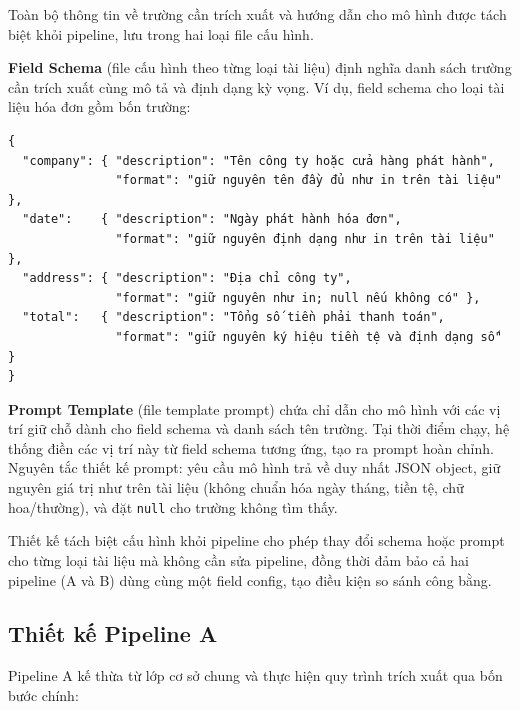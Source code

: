 ﻿\documentclass[12pt]{report}
\begin{document}
Toàn bộ thông tin về trường cần trích xuất và hướng dẫn cho mô hình được tách biệt khỏi pipeline, lưu trong hai loại file cấu hình.

\textbf{Field Schema} (file cấu hình theo từng loại tài liệu) định nghĩa danh sách trường cần trích xuất cùng mô tả và định dạng kỳ vọng. Ví dụ, field schema cho loại tài liệu hóa đơn gồm bốn trường:

\begin{verbatim}
{
  "company": { "description": "Tên công ty hoặc cửa hàng phát hành",
               "format": "giữ nguyên tên đầy đủ như in trên tài liệu" },
  "date":    { "description": "Ngày phát hành hóa đơn",
               "format": "giữ nguyên định dạng như in trên tài liệu" },
  "address": { "description": "Địa chỉ công ty",
               "format": "giữ nguyên như in; null nếu không có" },
  "total":   { "description": "Tổng số tiền phải thanh toán",
               "format": "giữ nguyên ký hiệu tiền tệ và định dạng số" }
}
\end{verbatim}

\textbf{Prompt Template} (file template prompt) chứa chỉ dẫn cho mô hình với các vị trí giữ chỗ dành cho field schema và danh sách tên trường. Tại thời điểm chạy, hệ thống điền các vị trí này từ field schema tương ứng, tạo ra prompt hoàn chỉnh. Nguyên tắc thiết kế prompt: yêu cầu mô hình trả về duy nhất JSON object, giữ nguyên giá trị như trên tài liệu (không chuẩn hóa ngày tháng, tiền tệ, chữ hoa/thường), và đặt \texttt{null} cho trường không tìm thấy.

Thiết kế tách biệt cấu hình khỏi pipeline cho phép thay đổi schema hoặc prompt cho từng loại tài liệu mà không cần sửa pipeline, đồng thời đảm bảo cả hai pipeline (A và B) dùng cùng một field config, tạo điều kiện so sánh công bằng.

\subsection{Thiết kế Pipeline A}\label{sec:vlm_design}

Pipeline A kế thừa từ lớp cơ sở chung và thực hiện quy trình trích xuất qua bốn bước chính:
\end{document}
